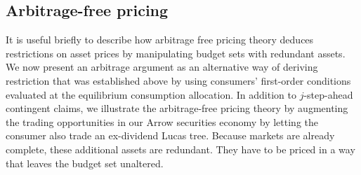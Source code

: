 \subsection{Arbitrage-free pricing}
It is useful briefly to describe how arbitrage free pricing theory
%
 deduces restrictions on asset
prices by manipulating  budget sets with redundant
assets.
We now present an
arbitrage argument as an alternative way of deriving restriction
 that was established above by using consumers'
first-order conditions evaluated at the equilibrium consumption
allocation. In addition to $j$-step-ahead contingent claims, we
illustrate the arbitrage-free pricing theory by augmenting the trading
opportunities in our Arrow securities economy by letting the
consumer also trade  an ex-dividend Lucas tree. Because markets
are already complete, these additional assets are redundant. They
have to be priced in a way that leaves the budget set
unaltered.


